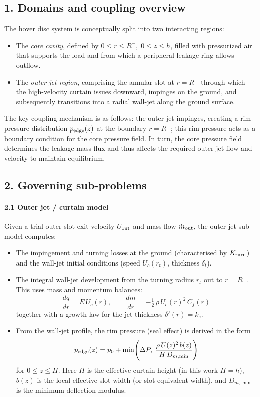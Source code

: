 \documentclass[11pt,a4paper]{article}
\begin{document}
\subsection*{1. Domains and coupling overview}
The hover disc system is conceptually split into two interacting regions:
\begin{itemize}
  \item The \emph{core cavity}, defined by \(0 \le r \le R^{-},\;0 \le z \le h\), filled with pressurized air that supports the load and from which a peripheral leakage ring allows outflow.
  \item The \emph{outer-jet region}, comprising the annular slot at \(r=R^{-}\) through which the high-velocity curtain issues downward, impinges on the ground, and subsequently transitions into a radial wall-jet along the ground surface.
\end{itemize}
The key coupling mechanism is as follows: the outer jet impinges, creating a rim pressure distribution \(p_{\rm edge}(z)\) at the boundary \(r=R^{-}\); this rim pressure acts as a boundary condition for the core pressure field. In turn, the core pressure field determines the leakage mass flux and thus affects the required outer jet flow and velocity to maintain equilibrium.

\subsection*{2. Governing sub-problems}
\paragraph{2.1 Outer jet / curtain model}  
Given a trial outer-slot exit velocity \(U_{\rm out}\) and mass flow \(\dot m_{\rm out}\), the outer jet sub-model computes:
\begin{itemize}
  \item The impingement and turning losses at the ground (characterised by \(K_{\rm turn}\)) and the wall-jet initial conditions (speed \(U_c(r_t)\), thickness \(\delta_t\)).
  \item The integral wall-jet development from the turning radius \(r_t\) out to \(r=R^{-}\). This uses mass and momentum balances:
    \[
      \frac{d q}{dr} = E\,U_c(r), 
      \qquad
      \frac{d m}{dr} = -\tfrac12\,\rho\,U_c(r)^2\,C_f(r)
    \]
    together with a growth law for the jet thickness \(\delta'(r)=k_e\).  
  \item From the wall-jet profile, the rim pressure (seal effect) is derived in the form  
    \[
      p_{\rm edge}(z) = p_0 + \min\!\Bigg(\Delta P,\;\frac{\rho\,U(z)^2\,b(z)}{H\,D_{m,\min}}\Bigg)
      \]
    for \(0\le z\le H\). Here \(H\) is the effective curtain height (in this work \(H=h\)), \(b(z)\) is the local effective slot width (or slot-equivalent width), and \(D_{m,\min}\) is the minimum deflection modulus.  
\end{itemize}
\end{document}
